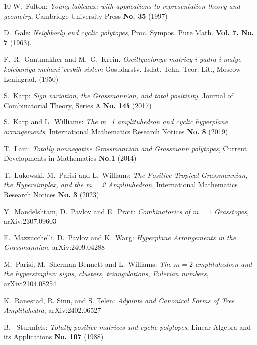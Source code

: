 \documentclass[english]{ourlematema}
\begin{document}
\begin{small}
\begin{thebibliography}{10}
W.~Fulton:
    {\em Young tableaux: with applications to representation theory and geometry}, Cambridge University Press {\bf No. 35} (1997)

D.~Gale:
    {\em Neighborly and cyclic polytopes}, Proc. Sympos. Pure Math. {\bf Vol. 7. No. 7} (1963).

F.~R.~Gantmakher and M.~G.~Krein. 
    {\em Oscillyacionye matricy i yadra i malye kolebaniya mehaniˇceskih sistem} Gosudarstv. Isdat. Tehn.-Teor. Lit., Moscow-Leningrad, (1950)



S.~Karp:
    {\em Sign variation, the Grassmannian, and total positivity}, Journal of Combinatorial Theory, Series A {\bf No. 145} (2017)

S.~Karp and L.~Williams:
    {\em The m=1 amplituhedron and cyclic hyperplane arrangements},
    International Mathematics Research Notices {\bf No. 8} (2019)

T.~Lam: 
    {\em Totally nonnegative Grassmannian and Grassmann polytopes},
    Current Developments in Mathematics {\bf No.1} (2014)

T.~Lukowski, M.~Parisi and L.~Williams:
    {\em The Positive Tropical Grassmannian, the Hypersimplex, and the m = 2 Amplituhedron},
   International Mathematics Research Notices
   {\bf No. 3} (2023)

Y.~Mandelshtam, D.~Pavlov and E.~Pratt:
    {\em Combinatorics of $ m= 1$ Grasstopes}, arXiv:2307.09603

E.~Mazzucchelli, D.~Pavlov and K.~Wang:
    {\em Hyperplane Arrangements in the Grassmannian},
    arXiv:2409.04288

M.~Parisi, M.~Sherman-Bennett and L.~Williams: 
    {\em The $m=2$ amplituhedron and the hypersimplex: signs, clusters, triangulations, Eulerian numbers},
    arXiv:2104.08254

K.~Ranestad, R. Sinn, and S. Telen: 
{\em Adjoints and Canonical Forms of Tree Amplituhedra}, arXiv:2402.06527

B. ~Sturmfels:
    {\em Totally positive matrices and cyclic polytopes}, Linear Algebra and its Applications {\bf No. 107} (1988)

\end{thebibliography}
\end{small}
\end{document}
